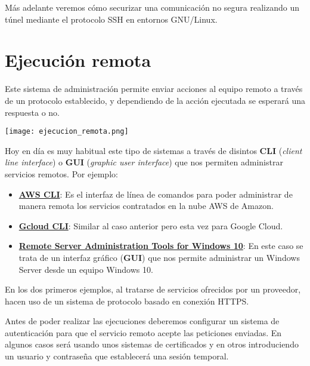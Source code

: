 
Más adelante veremos cómo securizar una comunicación no segura realizando un túnel mediante el protocolo SSH en entornos GNU/Linux.


\section{Ejecución remota}

Este sistema de administración permite enviar acciones al equipo remoto a través de un protocolo establecido, y  dependiendo de la acción ejecutada se esperará una respuesta o no.

\begin{center}
    \texttt{[image: ejecucion\_remota.png]}
\end{center}

Hoy en día es muy habitual este tipo de sistemas a través de disintos \textbf{CLI} (\textit{client line interface})  o \textbf{GUI} (\textit{graphic user interface}) que nos permiten administrar servicios remotos. Por ejemplo:

\begin{itemize}
    \item \textbf{\href{https://aws.amazon.com/es/cli/}{AWS CLI}}: Es el interfaz de línea de comandos para poder administrar de manera remota los servicios contratados en la nube AWS de Amazon.

    \item \textbf{\href{https://cloud.google.com/cli}{Gcloud CLI}}: Similar al caso anterior pero esta vez para Google Cloud.

    \item \textbf{\href{https://www.microsoft.com/en-us/download/details.aspx?id=45520}{Remote Server Administration Tools for Windows 10}}: En este caso se trata de un interfaz gráfico (\textbf{GUI}) que nos permite administrar un Windows Server desde un equipo Windows 10.
\end{itemize}

En los dos primeros ejemplos, al tratarse de servicios ofrecidos por un proveedor, hacen uso de un sistema de protocolo basado en conexión HTTPS.

Antes de poder realizar las ejecuciones deberemos configurar un sistema de autenticación para que el servicio remoto acepte las peticiones enviadas. En algunos casos será usando unos sistemas de certificados y en otros introduciendo un usuario y contraseña que establecerá una sesión temporal.

